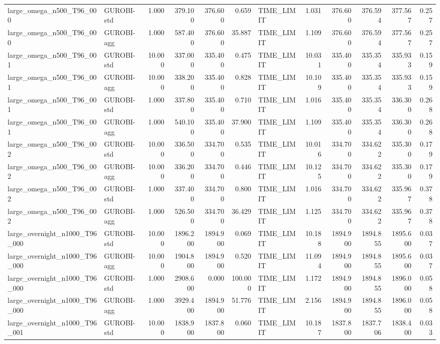 \begin{table}[htbp]
\begin{tabular}{llrrrrlrrrrr}
large\_omega\_n500\_T96\_000 & GUROBI-std & 1.000 & 379.100 & 376.600 & 0.659 & TIME\_LIMIT & 1.031 & 376.600 & 376.594 & 377.567 & 0.257 \\
large\_omega\_n500\_T96\_000 & GUROBI-agg & 1.000 & 587.400 & 376.600 & 35.887 & TIME\_LIMIT & 1.109 & 376.600 & 376.594 & 377.567 & 0.257 \\
large\_omega\_n500\_T96\_001 & GUROBI-std & 10.000 & 337.000 & 335.400 & 0.475 & TIME\_LIMIT & 10.031 & 335.400 & 335.354 & 335.933 & 0.159 \\
large\_omega\_n500\_T96\_001 & GUROBI-agg & 10.000 & 338.200 & 335.400 & 0.828 & TIME\_LIMIT & 10.109 & 335.400 & 335.354 & 335.933 & 0.159 \\
large\_omega\_n500\_T96\_001 & GUROBI-std & 1.000 & 337.800 & 335.400 & 0.710 & TIME\_LIMIT & 1.016 & 335.400 & 335.354 & 336.300 & 0.268 \\
large\_omega\_n500\_T96\_001 & GUROBI-agg & 1.000 & 540.100 & 335.400 & 37.900 & TIME\_LIMIT & 1.109 & 335.400 & 335.354 & 336.300 & 0.268 \\
large\_omega\_n500\_T96\_002 & GUROBI-std & 10.000 & 336.500 & 334.700 & 0.535 & TIME\_LIMIT & 10.016 & 334.700 & 334.622 & 335.300 & 0.179 \\
large\_omega\_n500\_T96\_002 & GUROBI-agg & 10.000 & 336.200 & 334.700 & 0.446 & TIME\_LIMIT & 10.125 & 334.700 & 334.622 & 335.300 & 0.179 \\
large\_omega\_n500\_T96\_002 & GUROBI-std & 1.000 & 337.400 & 334.700 & 0.800 & TIME\_LIMIT & 1.016 & 334.700 & 334.622 & 335.967 & 0.378 \\
large\_omega\_n500\_T96\_002 & GUROBI-agg & 1.000 & 526.500 & 334.700 & 36.429 & TIME\_LIMIT & 1.125 & 334.700 & 334.622 & 335.967 & 0.378 \\
large\_overnight\_n1000\_T96\_000 & GUROBI-std & 10.000 & 1896.200 & 1894.900 & 0.069 & TIME\_LIMIT & 10.188 & 1894.900 & 1894.855 & 1895.600 & 0.037 \\
large\_overnight\_n1000\_T96\_000 & GUROBI-agg & 10.000 & 1904.800 & 1894.900 & 0.520 & TIME\_LIMIT & 11.094 & 1894.900 & 1894.855 & 1895.600 & 0.037 \\
large\_overnight\_n1000\_T96\_000 & GUROBI-std & 1.000 & 2908.600 & 0.000 & 100.000 & TIME\_LIMIT & 1.172 & 1894.900 & 1894.855 & 1896.000 & 0.058 \\
large\_overnight\_n1000\_T96\_000 & GUROBI-agg & 1.000 & 3929.400 & 1894.900 & 51.776 & TIME\_LIMIT & 2.156 & 1894.900 & 1894.855 & 1896.000 & 0.058 \\
large\_overnight\_n1000\_T96\_001 & GUROBI-std & 10.000 & 1838.900 & 1837.800 & 0.060 & TIME\_LIMIT & 10.187 & 1837.800 & 1837.706 & 1838.400 & 0.033 \\

\end{tabular}
\end{table}
